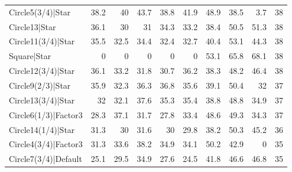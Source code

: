\begin{tabular}{lrrrrrrrrr}
 Circle5(3/4)|Star                                        &           38.2 &           40   &            43.7 &           38.8 &           41.9 &            48.9 &            38.5 &             3.7 &           38 \\
 Circle13|Star                                            &           36.1 &           30   &            31   &           34.3 &           33.2 &            38.4 &            50.5 &            51.3 &           38 \\
 Circle11(3/4)|Star                                       &           35.5 &           32.5 &            34.4 &           32.4 &           32.7 &            40.4 &            53.1 &            44.3 &           38 \\
 Square|Star                                              &            0   &            0   &             0   &            0   &            0   &            53.1 &            65.8 &            68.1 &           38 \\
 Circle12(3/4)|Star                                       &           36.1 &           33.2 &            31.8 &           30.7 &           36.2 &            38.3 &            48.2 &            46.4 &           38 \\
 Circle9(2/3)|Star                                        &           35.9 &           32.3 &            36.3 &           36.8 &           35.6 &            39.1 &            50.4 &            32   &           37 \\
 Circle13(3/4)|Star                                       &           32   &           32.1 &            37.6 &           35.3 &           35.4 &            38.8 &            48.8 &            34.9 &           37 \\
 Circle6(1/3)|Factor3                                     &           28.3 &           37.1 &            31.7 &           27.8 &           33.4 &            48.6 &            49.3 &            34.3 &           37 \\
 Circle14(1/4)|Star                                       &           31.3 &           30   &            31.6 &           30   &           29.8 &            38.2 &            50.3 &            45.2 &           36 \\
 Circle4(3/4)|Factor3                                     &           31.3 &           33.6 &            38.2 &           34.9 &           34.1 &            50.2 &            42.9 &             0   &           35 \\
 Circle7(3/4)|Default                                     &           25.1 &           29.5 &            34.9 &           27.6 &           24.5 &            41.8 &            46.6 &            46.8 &           35 \\

\end{tabular}
